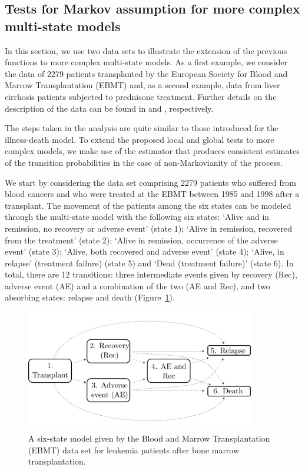 \subsection{Tests for Markov assumption for more complex multi-state models} \label{sec:mkv tests1}

In this section, we use two data sets to illustrate the extension of the previous functions to more complex multi-state models. As a first example, we consider the data of 2279 patients transplanted by the European Society for Blood and Marrow Transplantation (EBMT) and, as a second example, data from liver cirrhosis patients subjected to prednisone treatment. Further details on the description of the data can be found in \cite{Putter2007} and \cite{Andersen1993}, respectively. 

The steps taken in the analysis are quite similar to those introduced for the illness-death model. To extend the proposed local and global tests to more complex models, we make use of the  estimator that produces consistent estimates of the transition probabilities in the case of non-Markovianity of the process.

We start by considering the data set comprising 2279 patients who suffered from blood cancers and who were treated at the EBMT between 1985 and 1998 after a transplant. The movement of the patients among the six states can be modeled through the multi-state model with the following six states: `Alive and in remission, no recovery or adverse event' (state 1); `Alive in remission, recovered from the treatment' (state 2); `Alive in remission, occurrence of the adverse event' (state 3); `Alive, both recovered and adverse event' (state 4); `Alive, in relapse' (treatment failure) (state 5) and `Dead (treatment failure)' (state 6). In total, there are 12 transitions: three intermediate events given by recovery (Rec), adverse event (AE) and a combination of the two (AE and Rec), and two absorbing states: relapse and death (Figure~\ref{fig9b}).

\begin{figure}[t] %
\centering
\includegraphics[width=10cm]{bmt_model2.jpg}
\caption {A six-state model given by the Blood and Marrow Transplantation (EBMT) data set for leukemia patients after bone marrow transplantation.} 
\label{fig9b}
\end{figure}

